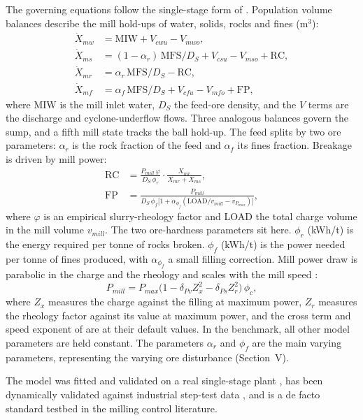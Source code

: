 \documentclass[conference]{IEEEtran}
\begin{document}
The governing equations follow the single-stage form of
\cite{leroux2013}. Population volume balances describe the mill hold-ups
of water, solids, rocks and fines (m$^3$):
\begin{align}
\dot X_{mw} &= \mathrm{MIW} + V_{cwu} - V_{mwo},\label{eq:mw}\\
\dot X_{ms} &= (1-\alpha_r)\,\mathrm{MFS}/D_S + V_{csu} - V_{mso} + \mathrm{RC},\label{eq:ms}\\
\dot X_{mr} &= \alpha_r\,\mathrm{MFS}/D_S - \mathrm{RC},\label{eq:mr}\\
\dot X_{mf} &= \alpha_f\,\mathrm{MFS}/D_S + V_{cfu} - V_{mfo} + \mathrm{FP},\label{eq:mf}
\end{align}
where MIW is the mill inlet water, $D_S$ the feed-ore density, and the
$V$ terms are the discharge and cyclone-underflow flows. Three analogous
balances govern the sump, and a fifth mill state tracks the ball
hold-up. The feed splits by two ore parameters: $\alpha_r$ is the rock
fraction of the feed and $\alpha_f$ its fines fraction. Breakage is
driven by mill power:
\begin{align}
\mathrm{RC} &= \frac{P_{mill}\,\varphi}{D_S\,\phi_r}\cdot
\frac{X_{mr}}{X_{mr}+X_{ms}},\label{eq:rc}\\
\mathrm{FP} &= \frac{P_{mill}}
{D_S\,\phi_f\bigl[1+\alpha_{\phi_f}(\mathrm{LOAD}/v_{mill}-v_{P_{max}})\bigr]},\label{eq:fp}
\end{align}
where $\varphi$ is an empirical slurry-rheology factor and LOAD the
total charge volume in the mill volume $v_{mill}$. The two ore-hardness
parameters sit here. $\phi_r$ (kWh/t) is the energy required per tonne
of rocks broken. $\phi_f$ (kWh/t) is the power needed per tonne of
fines produced, with $\alpha_{\phi_f}$ a small filling correction. Mill
power draw is parabolic in the charge and the rheology and scales with
the mill speed \cite{leroux2013,leroux2022}:
\begin{equation}
P_{mill} = P_{max}\bigl(1-\delta_{Pv}Z_x^{2}-\delta_{Ps}Z_r^{2}\bigr)\,\phi_c,
\label{eq:pmill}
\end{equation}
where $Z_x$ measures the charge against the filling at maximum power,
$Z_r$ measures the rheology factor against its value at maximum power,
and the cross term and speed exponent of \cite{leroux2013} are at their
default values. In the benchmark, all other model parameters are held
constant. The parameters $\alpha_r$ and $\phi_f$ are the main varying
parameters, representing the varying ore disturbance (Section~V).

The model was fitted and validated on a real single-stage plant
\cite{leroux2013}, has been dynamically validated against industrial
step-test data \cite{leroux2022}, and is a de facto standard testbed in
the milling control literature.
\end{document}
